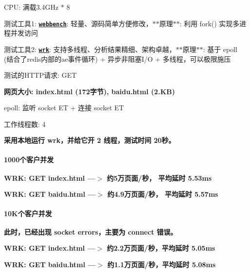 
\begin{DoxyItemize}
\item C\+PU\+: 满载3.4\+G\+Hz $\ast$ 8
\item 测试工具1\+: {\bfseries \href{http://home.tiscali.cz/~cz210552/webbench.html}{\tt webbench}}\+: 轻量、源码简单方便修改，$\ast$$\ast$原理$\ast$$\ast$\+: 利用 fork() 实现多进程并发访问
\item 测试工具2\+: {\bfseries \href{https://github.com/wg/wrk}{\tt wrk}}\+: 支持多线程、分析结果精细、架构卓越，$\ast$$\ast$原理$\ast$$\ast$\+: 基于 epoll (结合了redis内部的ae事件循环) + 异步非阻塞\+I/O + 多线程，可以极限施压
\item 测试的\+H\+T\+T\+P请求\+: G\+ET
\item {\bfseries 网页大小\+: index.\+html (172字节), baidu.\+html (2.\+KB)}
\item epoll\+: 监听 socket ET + 连接 socket ET
\item 工作线程数\+: 4
\end{DoxyItemize}





{\bfseries 采用本地运行 wrk，并给它开 2 线程，测试时间 20秒。}

\paragraph*{1000个客户并发}

{\bfseries W\+RK\+: G\+ET index.\+html ---$>$ 约5万页面/秒， 平均延时 5.\+53ms}



{\bfseries W\+RK\+: G\+ET baidu.\+html ---$>$ 约4.9万页面/秒， 平均延时 5.\+57ms}

 



\paragraph*{10\+K个客户并发}

{\bfseries 此时，已经出现 socket errors，主要为 connect 错误。}

{\bfseries W\+RK\+: G\+ET index.\+html ---$>$ 约2.2万页面/秒，平均延时 5.\+05ms} 

{\bfseries W\+RK\+: G\+ET baidu.\+html ---$>$ 约1.1万页面/秒，平均延时 5.\+08ms}  

 
